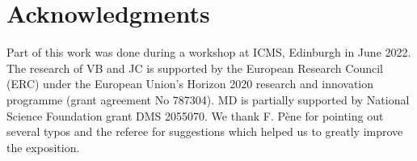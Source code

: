 \documentclass[AHL,Unicode,longabstracts,published]{cedram}
\begin{document}
\section*{Acknowledgments}

Part of this work was done during a workshop at ICMS, Edinburgh in June 2022. The research of VB and JC is supported by the European Research Council (ERC) under the European Union's Horizon 2020 research and innovation programme (grant agreement No 787304). MD is partially supported by National Science Foundation grant DMS 2055070. We thank F. Pène for pointing out several typos and the referee for suggestions which helped us to greatly improve the exposition.


\end{document}
